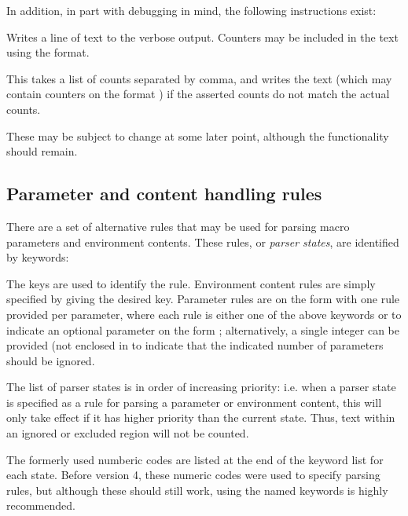 \documentclass{article}
\begin{document}


In addition, in part with debugging in mind, the following \TeXcount{} instructions exist:

\begin{description}

Writes a line of text to the verbose output. Counters may be included in the text using the  format.

This takes a list of counts separated by comma, and writes the text (which may contain counters on the format ) if the asserted counts do not match the actual counts.

\end{description}

These may be subject to change at some later point, although the functionality should remain.


\subsection{Parameter and content handling rules}\label{subsec:TC_addrule}

There are a set of alternative rules that may be used for parsing macro parameters and environment contents. These rules, or \emph{parser states}, are identified by keywords:
%


The keys are used to identify the rule. Environment content rules are simply specified by giving the desired key. Parameter rules are on the form  with one rule provided per parameter, where each rule is either one of the above keywords or  to indicate an optional parameter on the form \code{[\ldots]}; alternatively, a single integer can be provided (not enclosed in \code{[]} to indicate that the indicated number of parameters should be ignored.

The list of parser states is in order of increasing priority: i.e. when a parser state is specified as a rule for parsing a parameter or environment content, this will only take effect if it has higher priority than the current state. Thus, text within an ignored or excluded region will not be counted.

The formerly used numberic codes are listed at the end of the keyword list for each state. Before version 4, these numeric codes were used to specify parsing rules, but although these should still work, using the named keywords is highly recommended.
\end{document}
